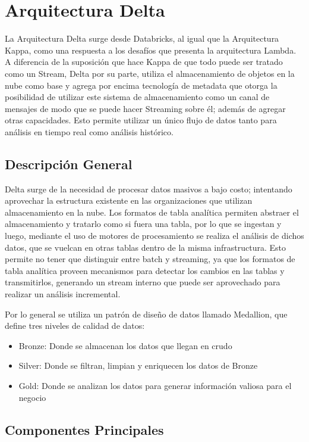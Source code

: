 \section{Arquitectura Delta}


La Arquitectura Delta surge desde Databricks, al igual que la Arquitectura Kappa, 
como una respuesta a los desafíos que presenta la arquitectura Lambda.
A diferencia de la suposición que hace Kappa de que todo puede ser tratado como un Stream, 
Delta por su parte, utiliza el almacenamiento de objetos en la nube como base y 
agrega por encima tecnología de metadata que otorga la posibilidad de utilizar este sistema de almacenamiento
como un canal de mensajes de modo que se puede hacer Streaming sobre él; además de agregar otras capacidades.
Esto permite utilizar un único flujo de datos tanto para análisis en tiempo real como análisis histórico. 


\subsection{Descripción General}

Delta surge de la necesidad de procesar datos masivos a bajo costo; intentando aprovechar la estructura existente
en las organizaciones que utilizan almacenamiento en la nube.
Los formatos de tabla analítica permiten abstraer el almacenamiento y tratarlo como si fuera una tabla, 
por lo que se ingestan y luego, mediante el uso de motores de procesamiento se realiza el análisis de dichos datos,
que se vuelcan en otras tablas dentro de la misma infrastructura.
Esto permite no tener que distinguir entre batch y streaming, ya que los formatos de tabla analítica proveen 
mecanismos para detectar los cambios en las tablas y transmitirlos, generando un stream interno que puede ser
aprovechado para realizar un análisis incremental. 

Por lo general se utiliza un patrón de diseño de datos llamado Medallion, que define tres niveles de calidad de datos:
\begin{itemize}
    \item Bronze: Donde se almacenan los datos que llegan en crudo
    \item Silver: Donde se filtran, limpian y enriquecen los datos de Bronze
    \item Gold: Donde se analizan los datos para generar información valiosa para el negocio 
\end{itemize}


\newpage
\subsection{Componentes Principales}

